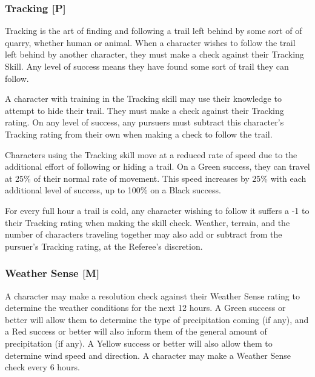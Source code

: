 \documentclass[oneside]{book}
\begin{document}
\begin{multicols}{2}
\subsubsection{Tracking [P]}
Tracking is the art of finding and following a trail left behind by some sort of of quarry, whether human or animal. When a character wishes to follow the trail left behind by another character, they must make a check against their Tracking Skill. Any level of success means they have found some sort of trail they can follow.

A character with training in the Tracking skill may use their knowledge to attempt to hide their trail. They must make a check against their Tracking rating. On any level of success, any pursuers must subtract this character's Tracking rating from their own when making a check to follow the trail. 

Characters using the Tracking skill move at a reduced rate of speed due to the additional effort of following or hiding a trail. On a Green success, they can travel at 25\% of their normal rate of movement. This speed increases by 25\% with each additional level of success, up to 100\% on a Black success.

For every full hour a trail is cold, any character wishing to follow it suffers a -1 to their Tracking rating when making the skill check. Weather, terrain, and the number of characters traveling together may also add or subtract from the pursuer's Tracking rating, at the Referee's discretion.

\subsubsection{Weather Sense [M]}
A character may make a resolution check against their Weather Sense rating to determine the weather conditions for the next 12 hours. A Green success or better will allow them to determine the type of precipitation coming (if any), and a Red success or better will also inform them of the general amount of precipitation (if any). A Yellow success or better will also allow them to determine wind speed and direction. A character may make a Weather Sense check every 6 hours.


\end{multicols}
\end{document}
